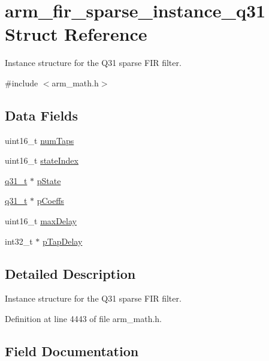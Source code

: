 \hypertarget{structarm__fir__sparse__instance__q31}{}\section{arm\+\_\+fir\+\_\+sparse\+\_\+instance\+\_\+q31 Struct Reference}
\label{structarm__fir__sparse__instance__q31}


Instance structure for the Q31 sparse F\+IR filter.  




{\ttfamily \#include $<$arm\+\_\+math.\+h$>$}

\subsection*{Data Fields}
\begin{DoxyCompactItemize}
\item 
uint16\+\_\+t \hyperlink{structarm__fir__sparse__instance__q31_a751941891e47f522a7f5375fe8990aac}{num\+Taps}
\item 
uint16\+\_\+t \hyperlink{structarm__fir__sparse__instance__q31_a566a0cb53437e48b9a3bf18e5b03d8aa}{state\+Index}
\item 
\hyperlink{arm__math_8h_adc89a3547f5324b7b3b95adec3806bc0}{q31\+\_\+t} $\ast$ \hyperlink{structarm__fir__sparse__instance__q31_adee4ba3ee8869865af7d8fa08ca913d6}{p\+State}
\item 
\hyperlink{arm__math_8h_adc89a3547f5324b7b3b95adec3806bc0}{q31\+\_\+t} $\ast$ \hyperlink{structarm__fir__sparse__instance__q31_a68888e36167d81cb7836db10367a1682}{p\+Coeffs}
\item 
uint16\+\_\+t \hyperlink{structarm__fir__sparse__instance__q31_ab25f4ee7550e6d92acff77ada283733f}{max\+Delay}
\item 
int32\+\_\+t $\ast$ \hyperlink{structarm__fir__sparse__instance__q31_adec00b3793ab4f08edfeb4ea6a9eb6e6}{p\+Tap\+Delay}
\end{DoxyCompactItemize}


\subsection{Detailed Description}
Instance structure for the Q31 sparse F\+IR filter. 

Definition at line 4443 of file arm\+\_\+math.\+h.



\subsection{Field Documentation}
